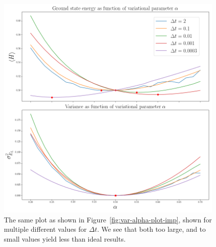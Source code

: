 \documentclass[twocolumn]{article}
\begin{document}
\begin{figure}[ht]
    \centering
    \includegraphics[width=0.9\linewidth]{../results/var-alpha-plot-imp-dts-10000.png}
    \caption{The same plot as shown in Figure~\ref{fig:var-alpha-plot-imp},
    shown for multiple different values for $\Delta t$. We see that both too
    large, and to small values yield less than ideal results.}
    \label{fig:var-alpha-plot-imp-dts}
\end{figure}




\printbibliography
\end{document}
